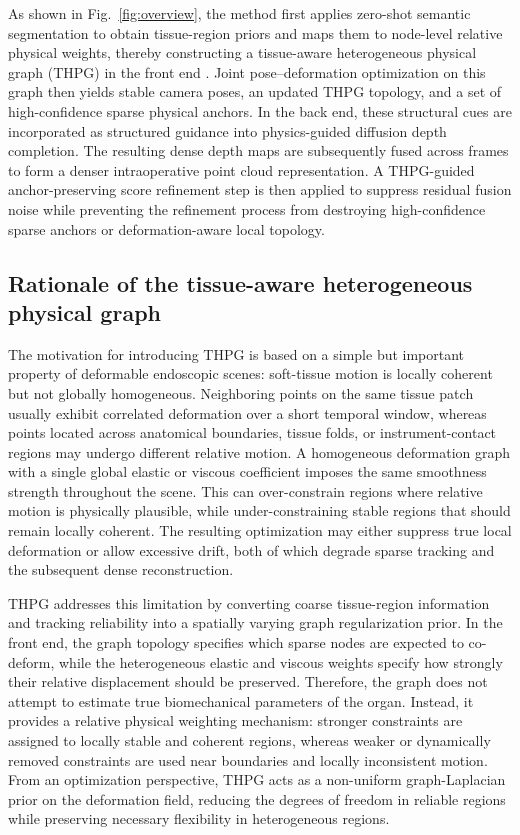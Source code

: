 \documentclass[pdflatex,sn-mathphys-num]{sn-jnl}
\begin{document}
As shown in Fig.~\ref{fig:overview}, the method first applies zero-shot semantic segmentation to obtain tissue-region priors and maps them to node-level relative physical weights, thereby constructing a tissue-aware heterogeneous physical graph (THPG) in the front end \cite{bib34,bib35}. Joint pose--deformation optimization on this graph then yields stable camera poses, an updated THPG topology, and a set of high-confidence sparse physical anchors. In the back end, these structural cues are incorporated as structured guidance into physics-guided diffusion depth completion. The resulting dense depth maps are subsequently fused across frames to form a denser intraoperative point cloud representation. A THPG-guided anchor-preserving score refinement step is then applied to suppress residual fusion noise while preventing the refinement process from destroying high-confidence sparse anchors or deformation-aware local topology.


\subsection{Rationale of the tissue-aware heterogeneous physical graph}\label{subsec:thpg_rationale}

The motivation for introducing THPG is based on a simple but important property of deformable endoscopic scenes: soft-tissue motion is locally coherent but not globally homogeneous. Neighboring points on the same tissue patch usually exhibit correlated deformation over a short temporal window, whereas points located across anatomical boundaries, tissue folds, or instrument-contact regions may undergo different relative motion. A homogeneous deformation graph with a single global elastic or viscous coefficient imposes the same smoothness strength throughout the scene. This can over-constrain regions where relative motion is physically plausible, while under-constraining stable regions that should remain locally coherent. The resulting optimization may either suppress true local deformation or allow excessive drift, both of which degrade sparse tracking and the subsequent dense reconstruction.

THPG addresses this limitation by converting coarse tissue-region information and tracking reliability into a spatially varying graph regularization prior. In the front end, the graph topology specifies which sparse nodes are expected to co-deform, while the heterogeneous elastic and viscous weights specify how strongly their relative displacement should be preserved. Therefore, the graph does not attempt to estimate true biomechanical parameters of the organ. Instead, it provides a relative physical weighting mechanism: stronger constraints are assigned to locally stable and coherent regions, whereas weaker or dynamically removed constraints are used near boundaries and locally inconsistent motion. From an optimization perspective, THPG acts as a non-uniform graph-Laplacian prior on the deformation field, reducing the degrees of freedom in reliable regions while preserving necessary flexibility in heterogeneous regions.
\end{document}
